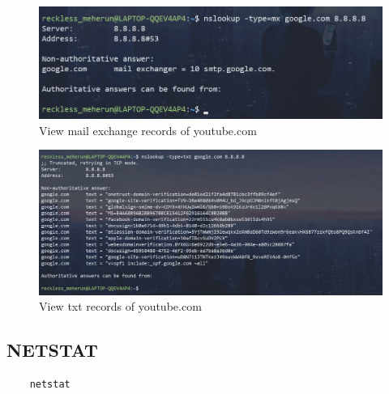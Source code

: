 \documentclass[11pt]{article}
\begin{document}
\begin{figure}[H]
\centering
\includegraphics[width=\textwidth]{res/nslookup 6.png}
\caption{View mail exchange records of youtube.com}
\end{figure}
\begin{figure}[H]
\centering
\includegraphics[width=\textwidth]{res/nslookup 7.png}
\caption{View txt records of youtube.com}
\end{figure}

\subsection{NETSTAT}
\begin{verbatim}
	netstat
\end{verbatim}
\end{document}
